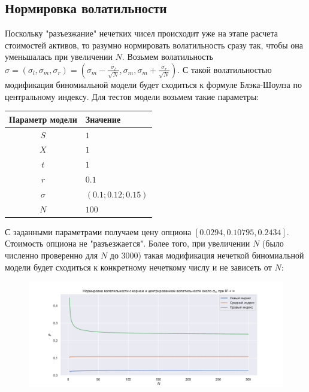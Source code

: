 \documentclass[a4paper,12pt]{extarticle} %
\begin{document}
	\subsection{Нормировка волатильности}
	Поскольку "разъезжание" нечетких чисел происходит уже на этапе расчета стоимостей активов, то разумно нормировать волатильность сразу так, чтобы она уменьшалась при увеличении $N$. Возьмем волатильность $\sigma=(\sigma_l, \sigma_m, \sigma_r)=(\sigma_m - \frac{\sigma_l}{\sqrt{N}}, \sigma_m, \sigma_m + \frac{\sigma_r}{\sqrt{N}})$. С такой волатильностью модификация биномиальной модели будет сходиться к формуле Блэка-Шоулза по центральному индексу. Для тестов модели возьмем такие параметры: 
	\begin{center}
		\begin{tabular}{|c|l|}
			\hline
			\textbf{Параметр модели} & \textbf{Значение} \\
			\hline
			$S$ & $1$ \\
			$X$ & $1$ \\
			$t$ & $1$ \\
			$r$ & $0.1$ \\
			$\sigma$ & $(0.1; 0.12; 0.15)$ \\
			$N$ & $100$ \\
			\hline
		\end{tabular}
	\end{center}
	
	С заданными параметрами получаем цену опциона $[0.0294, 0.10795, 0.2434]$. Стоимость опциона не "разъезжается". Более того, при увеличении $N$ (было численно проверенно для $N$ до $3000$) такая модификация нечеткой биномиальной модели будет сходиться к конкретному нечеткому числу и не зависеть от $N$:
	
	\begin{figure}[H]
		\centering
		\includegraphics[width=\textwidth]{_images/Нормировка волатильности с корнем и центрированием волатильности около $sigma_m$.pdf}
	\end{figure}
	
\end{document}
